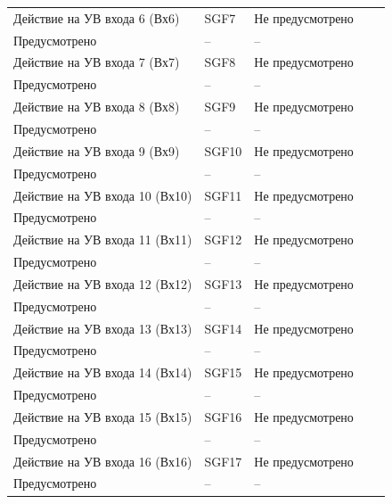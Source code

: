 \begin{longtable}{|>{\centering\arraybackslash}m{5.3cm}|>{\centering\arraybackslash}m{3.3cm}|>{\centering\arraybackslash}m{4.2cm}|>{\centering\arraybackslash}m{1.8cm}|>{\centering\arraybackslash}m{1cm}|}
\hline
\centering Действие на УВ входа 6 (Вх6)  & \centering SGF7 & \centering Не предусмотрено \\ Предусмотрено & \centering -- & \centering \arraybackslash -- \\
\hline
\centering Действие на УВ входа 7 (Вх7)  & \centering SGF8 & \centering Не предусмотрено \\ Предусмотрено & \centering -- & \centering \arraybackslash -- \\
\hline
\centering Действие на УВ входа 8 (Вх8)  & \centering SGF9 & \centering Не предусмотрено \\ Предусмотрено & \centering -- & \centering \arraybackslash -- \\
\hline
\centering Действие на УВ входа 9 (Вх9)  & \centering SGF10 & \centering Не предусмотрено \\ Предусмотрено & \centering -- & \centering \arraybackslash -- \\
\hline
\centering Действие на УВ входа 10 (Вх10)  & \centering SGF11 & \centering Не предусмотрено \\ Предусмотрено & \centering -- & \centering \arraybackslash -- \\
\hline
\centering Действие на УВ входа 11 (Вх11)  & \centering SGF12 & \centering Не предусмотрено \\ Предусмотрено & \centering -- & \centering \arraybackslash -- \\
\hline
\centering Действие на УВ входа 12 (Вх12)  & \centering SGF13 & \centering Не предусмотрено \\ Предусмотрено & \centering -- & \centering \arraybackslash -- \\
\hline
\centering Действие на УВ входа 13 (Вх13)  & \centering SGF14 & \centering Не предусмотрено \\ Предусмотрено & \centering -- & \centering \arraybackslash -- \\
\hline
\centering Действие на УВ входа 14 (Вх14)  & \centering SGF15 & \centering Не предусмотрено \\ Предусмотрено & \centering -- & \centering \arraybackslash -- \\
\hline
\centering Действие на УВ входа 15 (Вх15)  & \centering SGF16 & \centering Не предусмотрено \\ Предусмотрено & \centering -- & \centering \arraybackslash -- \\
\hline
\centering Действие на УВ входа 16 (Вх16)  & \centering SGF17 & \centering Не предусмотрено \\ Предусмотрено & \centering -- & \centering \arraybackslash -- \\

\end{longtable}

